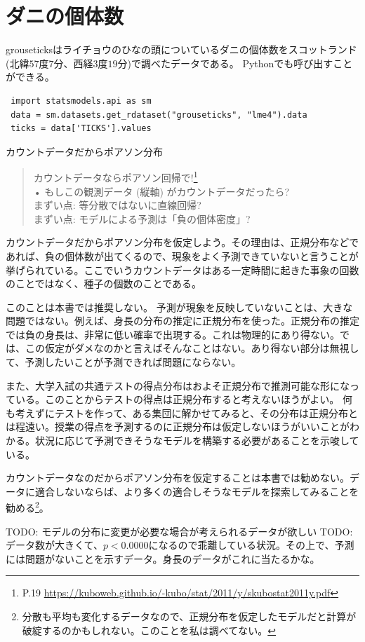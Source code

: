 
\section{ダニの個体数}
grouseticksはライチョウのひなの頭についているダニの個体数をスコットランド(北緯$57$度$7$分、西経$3$度$19$分)で調べたデータである。
Pythonでも呼び出すことができる。

\begin{lstlisting}
 import statsmodels.api as sm
 data = sm.datasets.get_rdataset("grouseticks", "lme4").data
 ticks = data['TICKS'].values
\end{lstlisting}

\begin{SMbox}{カウントデータだからポアソン分布}
 \begin{quote}
  カウントデータならポアソン回帰で!\footnote{P.19 \url{https://kuboweb.github.io/-kubo/stat/2011/y/skubostat2011y.pdf}}\\
  • もしこの観測データ (縦軸) がカウントデータだったら?\\
  まずい点: 等分散ではないに直線回帰?\\
  まずい点: モデルによる予測は「負の個体密度」?\\
 \end{quote}
 カウントデータだからポアソン分布を仮定しよう。その理由は、正規分布などであれば、負の個体数が出てくるので、現象をよく予測できていないと言うことが挙げられている。ここでいうカウントデータはある一定時間に起きた事象の回数のことではなく、種子の個数のことである。
 
 このことは本書では推奨しない。
 予測が現象を反映していないことは、大きな問題ではない。例えば、身長の分布の推定に正規分布を使った。正規分布の推定では負の身長は、非常に低い確率で出現する。これは物理的にあり得ない。では、この仮定がダメなのかと言えばそんなことはない。あり得ない部分は無視して、予測したいことが予測できれば問題にならない。

 また、大学入試の共通テストの得点分布はおよそ正規分布で推測可能な形になっている。このことからテストの得点は正規分布すると考えないほうがよい。
 何も考えずにテストを作って、ある集団に解かせてみると、その分布は正規分布とは程遠い。授業の得点を予測するのに正規分布は仮定しないほうがいいことがわかる。状況に応じて予測できそうなモデルを構築する必要があることを示唆している。

 カウントデータなのだからポアソン分布を仮定することは本書では勧めない。データに適合しないならば、より多くの適合しそうなモデルを探索してみることを勧める\footnote{分散も平均も変化するデータなので、正規分布を仮定したモデルだと計算が破綻するのかもしれない。このことを私は調べてない。}。

\end{SMbox}




TODO: モデルの分布に変更が必要な場合が考えられるデータが欲しい
TODO: データ数が大きくて、$p<0.0000$になるので乖離している状況。その上で、予測には問題がないことを示すデータ。身長のデータがこれに当たるかな。
\fi


